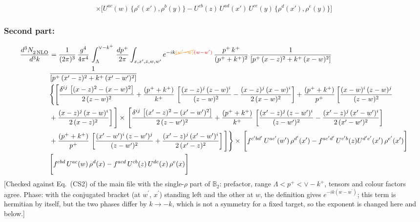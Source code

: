 \documentclass[9pt]{article}
\def\mf#1{\mathbb{#1}}
\numberwithin{equation}{section}
\begin{document}
\begin{align}
\times \Bigg[U^{ac}(w)\,\{\rho^{c}(x'),\rho^{b}(y)\}-U^{cb}(z)\,U^{ad}(x')\,U^{ce}(y)\, \{\rho^{d}(x'),\rho^{e}(y)\}\Bigg]
\end{align}
\subsubsection{Second part:\,}
\begin{align}
    \frac{d^{3}N_{2\,\rm NLO}^{\rm}}{d^{3}k}  & = \frac{1}{(2\pi)^{3}}\, \frac{g^{4}}{4\pi^{4}}\,\int_{\Lambda}^{\vee-k^{+}}\, \frac{dp^{+}}{2\pi}\int_{x,x',z,w,w^{\prime}} e^{-ik{\color{orange}\cancel{(w^{\prime}-w)}}{\color{red}(w-w^{\prime})}}\,\frac{p^{+}\,k^{+}}{(p^{+}+k^{+})^{2}}\, \frac{1}{\left[p^{+}\,(x-z)^{2}+k^{+}\,(x-w)^{2}\right]}\,\notag \\ & \frac{1}{\left[p^{+}\,(x'-z)^{2}+k^{+}\,(x'-w')^{2}\right]}\notag \\ & \Bigg\{\Bigg[\frac{\delta^{ij}\, \left[(x-z)^{2}-(x-w)^{2}\right]}{2\,(z-w)^{2}} + \frac{(p^{+}+k^{+})}{k^{+}}\, \left[\frac{(x-z)^{j}\,(z-w)^{i}}{(z-w)^{2}}-\frac{(x-z)^{j}\,(x-w)^{i}}{2\,(x-w)^{2}}\right]+\frac{(p^{+}+k^{+})}{p^{+}}\,\bigg[\frac{(x-w)^{i}\,(z-w)^{j}}{(z-w)^{2}}\notag \\ & +\frac{(x-z)^{j}\,(x-w)^{i}}{2\,(x-z)^{2}}\bigg]\,\Bigg]\times\, \Bigg[\frac{\delta^{ij}\, \left[(x'-z)^{2}-(x'-w')^{2}\right]}{2\,(z-w')^{2}}+ \frac{(p^{+}+k^{+})}{k^{+}}\, \left[\frac{(x'-z)^{j}\,(z-w')^{i}}{(z-w')^{2}}-\frac{(x'-z)^{j}\,(x'-w')^{i}}{2\,(x'-w')^{2}}\right]\notag \\ & +\frac{(p^{+}+k^{+})}{p^{+}}\,\left[\frac{(x'-w')^{i}\,(z-w')^{j}}{(z-w')^{2}} +\frac{(x'-z)^{j}\,(x'-w')^{i}}{2\,(x'-z)^{2}}\right] \Bigg] \Bigg\} \times\, \Bigg[f^{c'bd'}\, U^{ac'}(w')\,\rho^{d'}(x')-f^{ac'd'}\, U^{c'b}(z)U^{d'e'}(x')\, \rho^{e'}(x')\Bigg]\notag \\ & \Bigg[f^{cbd}\, U^{ac}(w)\,\rho^{d}(x) - f^{acd}\, U^{cb}(z)\,U^{de}(x)\, \rho^{e}(x)\Bigg]
\end{align} {\color{red}[Checked against Eq.~(CS2) of the main file with the single-$\rho$ part of $\mf{B}_{2}$: prefactor, range $\Lambda<p^{+}<\vee-k^{+}$, tensors and colour factors agree. Phase: with the conjugated bracket (at $w^{\prime}$, $x^{\prime}$) standing left and the other at $w$, the definition gives $e^{-ik(w-w^{\prime})}$; this term is hermitian by itself, but the two phases differ by $k\to-k$, which is not a symmetry for a fixed target, so the exponent is changed here and below.]}\par\noindent 
\end{document}
